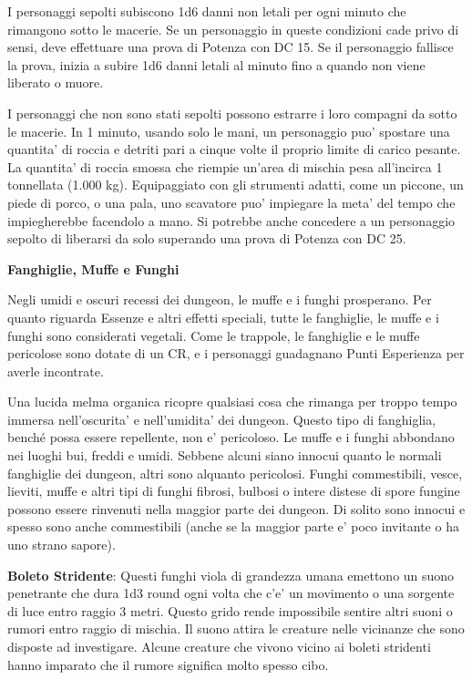 \documentclass[a4paper,11pt,twoside,openany]{dndbook}
\begin{document}
{I personaggi sepolti subiscono 1d6 danni non letali per ogni minuto che rimangono sotto le macerie. Se un personaggio in queste condizioni cade privo di sensi, deve effettuare una prova di Potenza con DC 15. Se il personaggio fallisce la prova, inizia a subire 1d6 danni letali al minuto fino a quando non viene liberato o muore.

I personaggi che non sono stati sepolti possono estrarre i loro compagni da sotto le macerie. In 1 minuto, usando solo le mani, un personaggio puo' spostare una quantita' di roccia e detriti pari a cinque volte il proprio limite di carico pesante. La quantita' di roccia smossa che riempie un'area di mischia pesa all'incirca 1 tonnellata (1.000 kg). Equipaggiato con gli strumenti adatti, come un piccone, un piede di porco, o una pala, uno scavatore puo' impiegare la meta' del tempo che impiegherebbe facendolo a mano. Si potrebbe anche concedere a un personaggio sepolto di liberarsi da solo superando una prova di Potenza con DC 25.

\textbf{Fanghiglie, Muffe e Funghi}

Negli umidi e oscuri recessi dei dungeon, le muffe e i funghi prosperano. Per quanto riguarda Essenze e altri effetti speciali, tutte le fanghiglie, le muffe e i funghi sono considerati vegetali. Come le trappole, le fanghiglie e le muffe pericolose sono dotate di un CR, e i personaggi guadagnano Punti Esperienza per averle incontrate.

Una lucida melma organica ricopre qualsiasi cosa che rimanga per troppo tempo immersa nell'oscurita' e nell'umidita' dei dungeon. Questo tipo di fanghiglia, benché possa essere repellente, non e' pericoloso. Le muffe e i funghi abbondano nei luoghi bui, freddi e umidi. Sebbene alcuni siano innocui quanto le normali fanghiglie dei dungeon, altri sono alquanto pericolosi. Funghi commestibili, vesce, lieviti, muffe e altri tipi di funghi fibrosi, bulbosi o intere distese di spore fungine possono essere rinvenuti nella maggior parte dei dungeon. Di solito sono innocui e spesso sono anche commestibili (anche se la maggior parte e' poco invitante o ha uno strano sapore).

\textbf{Boleto Stridente}: Questi funghi viola di grandezza umana emettono un suono penetrante che dura 1d3 round ogni volta che c'e' un movimento o una sorgente di luce entro raggio 3 metri. Questo grido rende impossibile sentire altri suoni o rumori entro raggio di mischia. Il suono attira le creature nelle vicinanze che sono disposte ad investigare. Alcune creature che vivono vicino ai boleti stridenti hanno imparato che il rumore significa molto spesso cibo.

}
\end{document}
